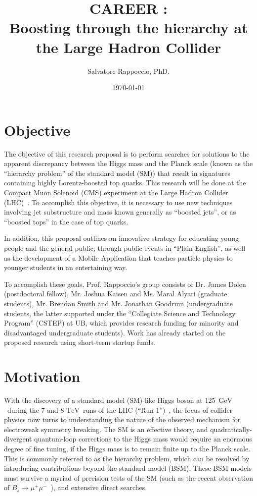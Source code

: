 \documentclass[12pt]{proposalnsf}
\newcommand{\TeV}{\ensuremath{\mathrm{TeV}}}
\newcommand{\GeVcc}{\ensuremath{\mathrm{GeV}}}
\begin{document}
\title{CAREER :\\Boosting through the hierarchy at the Large Hadron
  Collider }

\author{Salvatore Rappoccio, PhD.}

\date{\today}

\maketitle

\section{Objective}
The objective of this research proposal is to perform searches for
solutions to the apparent discrepancy between the Higgs mass and the
Planck scale (known as the ``hierarchy problem'' of the standard model
(SM)) that result in signatures containing highly Lorentz-boosted top
quarks. This research will be done at the Compact Muon Solenoid (CMS)
experiment at the Large Hadron Collider (LHC)~\cite{:2008zzk}. To
accomplish this objective, it is necessary to use new
techniques involving jet substructure and mass known generally as
``boosted jets'', or as ``boosted tops'' in the case of top quarks. 

In addition, this proposal outlines an innovative strategy for
educating young people and the general public, through public events
in ``Plain English'', as well as the development of a Mobile
Application that teaches particle physics to younger students in an
entertaining way. 


To accomplish these goals, Prof. Rappoccio's group consists
of Dr. James Dolen (postdoctoral fellow), Mr. Joshua Kaisen and Ms. Maral Alyari
(graduate students), Mr. Brendan Smith and Mr. Jonathan Goodrum (undergraduate
students, the latter supported under the ``Collegiate Science and
Technology Program'' (CSTEP)
at UB, which provides research funding for minority and
disadvantaged undergraduate students). Work has already started
on the proposed research using short-term startup funds. 




\section{Motivation}

With the discovery of a 
standard model (SM)-like Higgs boson at
125~\GeVcc\ during the 7 and 8 \TeV\ runs of the LHC 
(``Run 1'')~\cite{higgs_atlas,higgs_cms}, 
the focus of collider physics now turns to understanding the nature of
the observed mechanism for electroweak symmetry breaking.
The SM is an effective theory, and quadratically-divergent
quantum-loop corrections to the Higgs
mass would require an enormous degree of fine tuning, if the Higgs
mass is to remain finite up to the Planck scale. This is commonly
referred to as the hierarchy problem, which can be resolved by
introducing contributions beyond the standard model (BSM). 
These BSM models must survive a myriad of precision tests of the SM
(such as the recent observation of $B_s\rightarrow
\mu^+\mu^-$~\cite{bsmumu_cms,bsmumu_lhcb}), and extensive direct
searches. 
\end{document}
